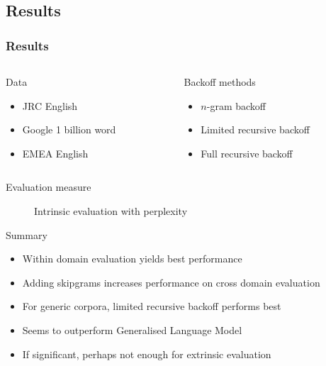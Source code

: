 \documentclass{beamer}
\begin{document}
\begin{frame}\section{Results}
    \frametitle{Results}

    \begin{columns}[T,totalwidth=\linewidth]
        \begin{column}{0.475\textwidth}
            \begin{block}{Data}
                \begin{itemize}
                    \item JRC English
                    \item Google 1 billion word
                    \item EMEA English
                \end{itemize}
            \end{block}
        \end{column}    
        \begin{column}{0.475\textwidth}
            \begin{block}{Backoff methods}
                \begin{itemize}
                    \item $n$-gram backoff
                    \item Limited recursive backoff
                    \item Full recursive backoff
                \end{itemize}
            \end{block}
        \end{column}    
    \end{columns}

    \begin{description}
        \item[Evaluation measure] Intrinsic evaluation with perplexity
    \end{description}

    \begin{block}{Summary}
        \begin{itemize}
            \item Within domain evaluation yields best performance
            \item Adding skipgrams increases performance on cross domain evaluation
            \item For generic corpora, limited recursive backoff performs best
            \item Seems to outperform Generalised Language Model
            \item If significant, perhaps not enough for extrinsic evaluation
        \end{itemize}
    \end{block}
\end{frame}
\end{document}
